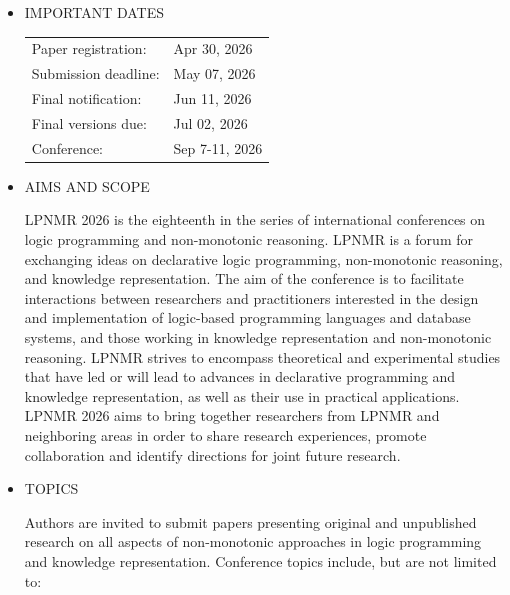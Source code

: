 \documentclass[prodmode,acmtecs]{acmsmall} %
\begin{document}
\begin{itemize}\item  IMPORTANT DATES 
 
\begin{tabulary}{\linewidth}{LL}Paper registration:  & Apr 30, 2026 \\
Submission deadline:  & May 07, 2026 \\
Final notification:  & Jun 11, 2026 \\
Final versions due:  & Jul 02, 2026 \\
Conference:  & Sep 7-11, 2026 \\
\end{tabulary}
 
\item  AIMS AND SCOPE 
 
  LPNMR 2026 is the eighteenth in the series of international conferences on logic programming and non-monotonic reasoning. LPNMR is a forum for exchanging ideas on declarative logic programming, non-monotonic reasoning, and knowledge representation. The aim of the conference is to facilitate interactions between researchers and practitioners interested in the design and implementation of logic-based programming languages and database systems, and those working in knowledge representation and non-monotonic reasoning. LPNMR strives to encompass theoretical and experimental studies that have led or will lead to advances in declarative programming and knowledge representation, as well as their use in practical applications. LPNMR 2026 aims to bring together researchers from LPNMR and neighboring areas in order to share research experiences, promote collaboration and identify directions for joint future research. 
 
\item  TOPICS 
 
  Authors are invited to submit papers presenting original and unpublished research on all aspects of non-monotonic approaches in logic programming and knowledge representation. Conference topics include, but are not limited to: 
 

\end{itemize}
\end{document}
